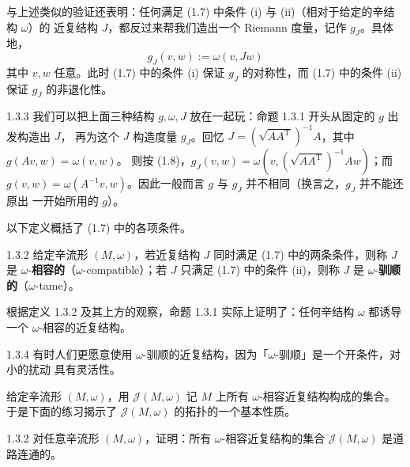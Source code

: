 与上述类似的验证还表明：任何满足 (1.7) 中条件 (i) 与 (ii)（相对于给定的辛结构 $\omega$）的
近复结构 $J$，都反过来帮我们造出一个 Riemann 度量，记作 $g_J$。具体地，
\begin{equation}
  g_J(v,w):=\omega(v,Jw)
  \tag{1.8}
\end{equation}
其中 $v,w$ 任意。此时 (1.7) 中的条件 (i) 保证 $g_J$ 的对称性，而 (1.7) 中的条件 (ii) 保证
$g_J$ 的非退化性。

\begin{wrem}{1.3.3}
我们可以把上面三种结构 $g,\omega,J$ 放在一起玩：命题 1.3.1 开头从固定的 $g$ 出发构造出 $J$，
再为这个 $J$ 构造度量 $g_J$。回忆 $J=(\sqrt{AA^{\mathrm T}})^{-1}A$，其中 $g(Av,w)=\omega(v,w)$。
则按 (1.8)，$g_J(v,w)=\omega(v,(\sqrt{AA^{\mathrm T}})^{-1}Aw)$；而
$g(v,w)=\omega(A^{-1}v,w)$。因此一般而言 $g$ 与 $g_J$ 并不相同（换言之，$g_J$ 并不能还原出
一开始所用的 $g$）。
\end{wrem}

以下定义概括了 (1.7) 中的各项条件。

\begin{wdefn}{1.3.2}
给定辛流形 $(M,\omega)$，若近复结构 $J$ 同时满足 (1.7) 中的两条条件，则称 $J$ 是
$\omega$-\textbf{相容的}（$\omega$-compatible）；若 $J$ 只满足 (1.7) 中的条件 (ii)，则称 $J$
是 $\omega$-\textbf{驯顺的}（$\omega$-tame）。
\end{wdefn}

根据定义 1.3.2 及其上方的观察，命题 1.3.1 实际上证明了：任何辛结构 $\omega$ 都诱导一个
$\omega$-相容的近复结构。

\begin{wrem}{1.3.4}
有时人们更愿意使用 $\omega$-驯顺的近复结构，因为「$\omega$-驯顺」是一个开条件，对小的扰动
具有灵活性。
\end{wrem}

给定辛流形 $(M,\omega)$，用 $\mathcal{J}(M,\omega)$ 记 $M$ 上所有 $\omega$-相容近复结构构成的集合。
于是下面的练习揭示了 $\mathcal{J}(M,\omega)$ 的拓扑的一个基本性质。

\begin{wexer}{1.3.2}
对任意辛流形 $(M,\omega)$，证明：所有 $\omega$-相容近复结构的集合 $\mathcal{J}(M,\omega)$
是道路连通的。
\end{wexer}

